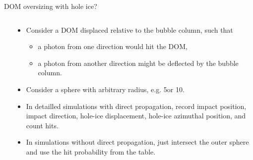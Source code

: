 
\begin{frame}[fragile]{DOM oversizing with hole ice?}

  \begin{columns}
    \begin{column}{0.5\textwidth}
      \begin{overlayarea}{\textwidth}{\textheight}
        \vspace*{2cm}
      \end{overlayarea}
    \end{column}
    \begin{column}{0.5\textwidth}
      \begin{itemize}
        \item Consider a DOM displaced relative to the bubble column, such that
        \begin{itemize}
          \item a photon from one direction would hit the DOM,
          \item<2-> a photon from another direction might be deflected by the bubble column.
        \end{itemize}
        \item<3-> Consider a sphere with arbitrary radius, e.g. 5\m or 10\m.
        \item<4-> In detailled simulations with direct propagation, record impact position, impact direction, hole-ice displacement, hole-ice azimuthal position, and count hits.
        \item<5> In simulations without direct propagation, just intersect the outer sphere and use the hit probability from the table.
      \end{itemize}
    \end{column}
  \end{columns}


\end{frame}